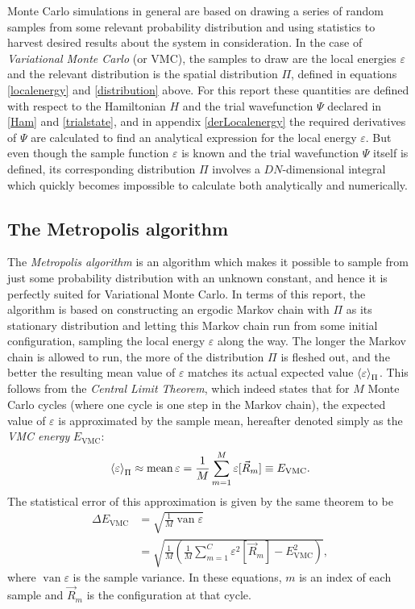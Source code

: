 \documentclass[a4paper,8pt]{article}
\DeclareMathOperator{\mean}{mean}
\DeclareMathOperator{\van}{van}
\begin{document}
\begin{multicols}{2}
Monte Carlo simulations in general are based on drawing a series of random samples from some relevant probability distribution and using statistics to harvest desired results about the system in consideration. In the case of \textit{Variational Monte Carlo} (or VMC), the samples to draw are the local energies $\varepsilon$ and the relevant distribution is the spatial distribution $\Pi$, defined in equations \eqref{localenergy} and \eqref{distribution} above. For this report these quantities are defined with respect to the Hamiltonian $H$ and the trial wavefunction $\Psi$ declared in \eqref{Ham} and \eqref{trialstate}, and in appendix \ref{derLocalenergy} the required derivatives of $\Psi$ are calculated to find an analytical expression for the local energy $\varepsilon$. But even though the sample function $\varepsilon$ is known and the trial wavefunction $\Psi$ itself is defined, its corresponding distribution $\Pi$ involves a $DN$-dimensional integral which quickly becomes impossible to calculate both analytically and numerically.


\subsection{The Metropolis algorithm}\label{Metropolis}
The \textit{Metropolis algorithm} is an algorithm which makes it possible to sample from just some probability distribution with an unknown constant, and hence it is perfectly suited for Variational Monte Carlo. In terms of this report, the algorithm is based on constructing an ergodic Markov chain with $\Pi$ as its stationary distribution and letting this Markov chain run from some initial configuration, sampling the local energy $\varepsilon$ along the way. The longer the Markov chain is allowed to run, the more of the distribution $\Pi$ is fleshed out, and the better the resulting mean value of $\varepsilon$ matches its actual expected value $\ev{\varepsilon}_\Pi$. This follows from the \textit{Central Limit Theorem}, which indeed states that for $M$ Monte Carlo cycles (where one cycle is one step in the Markov chain), the expected value of $\varepsilon$ is approximated by the sample mean, hereafter denoted simply as the \textit{VMC energy} $E_\text{VMC}$:
\begin{equation}\label{estimate}
\ev{\varepsilon}_\Pi \approx \mean\varepsilon = \frac{1}{M}\sum\limits_{m = 1}^M \varepsilon[\vec{R}_m] \equiv E_\text{VMC}.
\end{equation}
The statistical error of this approximation is given by the same theorem to be
\begin{align}
\Delta E_\text{VMC} &= \sqrt{\frac{1}{M} \van\varepsilon} \nonumber\\
&= \sqrt{\frac{1}{M}\left(\frac{1}{M}\sum\limits_{m = 1}^C \varepsilon^2[\vec{R}_m] - E^2_\text{VMC}\right)}, \label{error}
\end{align}
where $\van\varepsilon$ is the sample variance. In these equations, $m$ is an index of each sample and $\vec{R}_m$ is the configuration at that cycle.


\end{multicols}
\end{document}
